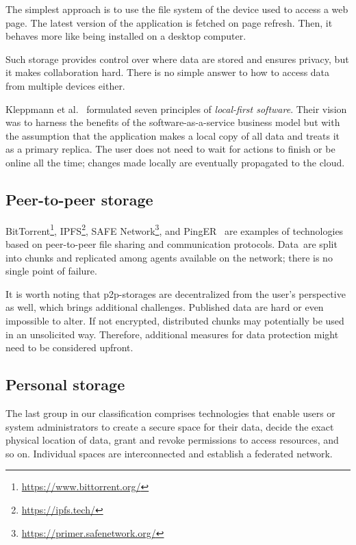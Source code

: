 The simplest approach is to use the file system of the device used to access a web page. The latest version of the application is fetched on page refresh. Then, it behaves more like being installed on a desktop computer.

Such storage provides control over where data are stored and ensures privacy, but it makes collaboration hard. There is no simple answer to how to access data from multiple devices either.

Kleppmann et al.~\cite{kleppman19} formulated seven principles of \emph{local-first software}. Their vision was to harness the benefits of the software-as-a-service business model but with the assumption that the application makes a local copy of all data and treats it as a primary replica. The user does not need to wait for actions to finish or be online all the time; changes made locally are eventually propagated to the cloud.

\subsection*{Peer-to-peer storage}

BitTorrent\footnote{\href{https://www.bittorrent.org/}{https://www.bittorrent.org/}}, IPFS\footnote{\href{https://ipfs.tech/}{https://ipfs.tech/}}, SAFE Network\footnote{\href{https://primer.safenetwork.org/}{https://primer.safenetwork.org/}}, and PingER~\cite{ali18} are examples of technologies based on peer-to-peer file sharing and communication protocols. Data~are split into chunks and replicated among agents available on the network; there is no single point of failure.

It is worth noting that p2p-storages are decentralized from the user's perspective as well, which brings additional challenges. Published data are hard or even impossible to alter. If not encrypted, distributed chunks may potentially be used in an unsolicited way. Therefore, additional measures for data protection might need to be considered upfront.

\subsection*{Personal storage}

The last group in our classification comprises technologies that enable users or system administrators to create a secure space for their data, decide the exact physical location of data, grant and revoke permissions to access resources, and so on. Individual spaces are interconnected and establish a federated network.

